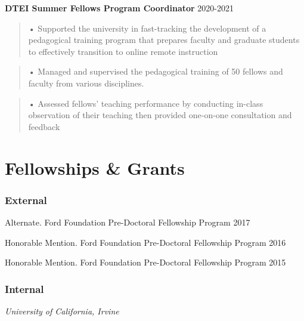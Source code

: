 \documentclass[10pt,]{article}
\renewenvironment{itemize}{
  \begin{list}{}{
    \setlength{\leftmargin}{1.5em}
  }
}{
  \end{list}
}
\begin{document}
\textbf{DTEI Summer Fellows Program Coordinator} \hfill 2020-2021

\begin{quote}
• Supported the university in fast-tracking the development of a
pedagogical training program that prepares faculty and graduate students
to effectively transition to online remote instruction
\end{quote}

\begin{quote}
• Managed and supervised the pedagogical training of 50 fellows and
faculty from various disciplines.
\end{quote}

\begin{quote}
• Assessed fellows' teaching performance by conducting in-class
observation of their teaching then provided one-on-one consultation and
feedback
\end{quote}

\hypertarget{fellowships-grants}{%
\section{Fellowships \& Grants}\label{fellowships-grants}}

\hypertarget{external}{%
\subsubsection{External}\label{external}}

\begin{itemize}
\item
  Alternate. Ford Foundation Pre-Doctoral Fellowship Program \hfill 2017
\item
  Honorable Mention. Ford Foundation Pre-Doctoral Fellowship Program
  \hfill 2016
\item
  Honorable Mention. Ford Foundation Pre-Doctoral Fellowship Program
  \hfill 2015
\end{itemize}

\hypertarget{internal}{%
\subsubsection{Internal}\label{internal}}

\emph{University of California, Irvine}
\end{document}
